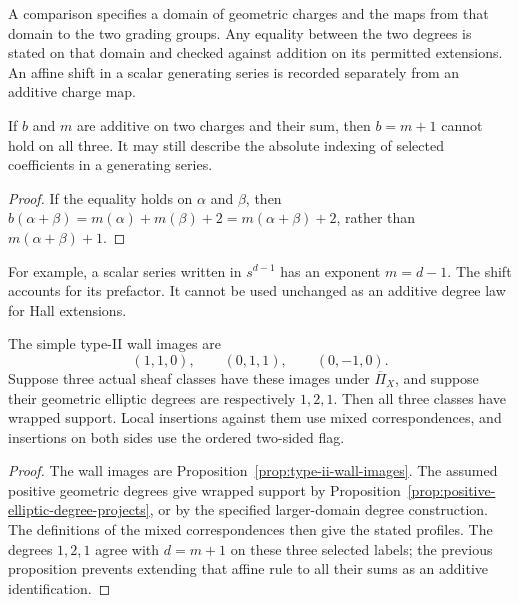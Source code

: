 \begin{definition}
\label{def:geometric-borcherds-degree-comparison-datum}
A comparison specifies a domain of geometric charges and the
maps from that domain to the two grading groups. Any equality
between the two degrees is stated on that domain and checked
against addition on its permitted extensions. An affine shift
in a scalar generating series is recorded separately from an
additive charge map.
\end{definition}

\begin{proposition}
\label{prop:geometric-borcherds-degree-separation}
If $b$ and $m$ are additive on two charges and their sum, then
$b=m+1$ cannot hold on all three. It may still describe the
absolute indexing of selected coefficients in a generating
series.
\end{proposition}

\begin{proof}
If the equality holds on $\alpha$ and $\beta$, then
$b(\alpha+\beta)=m(\alpha)+m(\beta)+2
=m(\alpha+\beta)+2$, rather than $m(\alpha+\beta)+1$.
\end{proof}

For example, a scalar series written in $s^{d-1}$ has an exponent
$m=d-1$. The shift accounts for its prefactor. It cannot be used
unchanged as an additive degree law for Hall extensions.

\begin{proposition}
\label{prop:middle-type-ii-wall-wrapped-mixed}
\label{prop:type-ii-walls-hybrid-operation-recovery}
The simple type-II wall images are
\[
 (1,1,0),\qquad(0,1,1),\qquad(0,-1,0).
\]
Suppose three actual sheaf classes have these images under
$\overline\Pi_X$, and suppose their geometric elliptic degrees
are respectively $1,2,1$. Then all three classes have wrapped
support. Local insertions against them use mixed correspondences,
and insertions on both sides use the ordered two-sided flag.
\end{proposition}

\begin{proof}
The wall images are Proposition~\ref{prop:type-ii-wall-images}.
The assumed positive geometric degrees give wrapped support by
Proposition~\ref{prop:positive-elliptic-degree-projects}, or by
the specified larger-domain degree construction. The definitions
of the mixed correspondences then give the stated profiles.
The degrees $1,2,1$ agree with $d=m+1$ on these three selected
labels; the previous proposition prevents extending that affine
rule to all their sums as an additive identification.
\end{proof}

